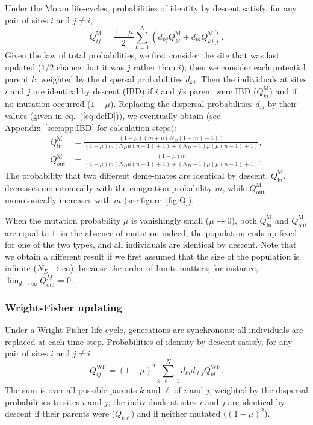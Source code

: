 \documentclass[11pt, letterpaper]{article}
\renewcommand{\eqref}[1]{\textup{{\normalfont eq.~(\ref{#1}}\normalfont)}}
\newcommand{\appname}[0]{Appendix}
\newcommand{\Moran}{\textrm{M}}
\newcommand{\WF}{\textrm{WF}}
\newcommand{\inn}{\textrm{in}}
\newcommand{\out}{\textrm{out}}
\newcommand{\Qin}{Q_{\inn}}
\newcommand{\Qout}{Q_{\out}}
\newcommand{\ndemes}{N_D}
\begin{document}
Under the Moran life-cycles, probabilities of identity by descent satisfy, for any pair of sites $i$ and $j\neq i$,
\begin{equation}
Q_{ij}^{\Moran} = \frac{1-\mu}{2} \sum_{k=1}^N \left(d_{kj} Q_{ki}^{\Moran} + d_{ki} Q_{kj}^{\Moran}\right).
\end{equation}
%
Given the law of total probabilities, we first consider the site that was last updated ($1/2$ chance that it was $j$ rather than $i$); then we consider each potential parent $k$, weighted by the dispersal probabilities $d_{kj}$. Then the individuals at sites $i$ and $j$ are identical by descent (IBD) if $i$ and $j$'s parent were IBD ($Q_{ki}^{\Moran}$) and if no mutation occurred ($1-\mu$).  Replacing the dispersal probabilities $d_{ij}$ by their values (given in \eqref{eq:defD}), we eventually obtain (see \appname~\ref{sec:app:IBD} for calculation steps):
\begin{subequations}\label{eq:QM}
\begin{align}
\Qin^{\Moran} &= \frac{(1-\mu ) \left(m + \mu  (\ndemes (1-m)-1)\right)}{(1-\mu ) m (\ndemes \mu  (n-1)+1)+(\ndemes-1) \mu  (\mu  (n-1)+1)},\\
%
%
\Qout^{\Moran} & = \frac{(1-\mu ) m}{(1-\mu ) m (\ndemes \mu  (n-1)+1)+(\ndemes-1) \mu  (\mu  (n-1)+1)}.
\end{align}
\end{subequations}
%
The probability that two different deme-mates are identical by descent, $\Qin^{\Moran}$, decreases monotonically with the emigration probability $m$, while  $\Qout^{\Moran}$ monotonically increases with $m$ (see figure~\ref{fig:Q}). 

When the mutation probability $\mu$ is vanishingly small ($\mu \to 0$), both $\Qin^{\Moran}$ and $\Qout^{\Moran}$ are equal to $1$: in the absence of mutation indeed, the population ends up fixed for one of the two types, and all individuals are identical by descent. Note that we obtain a different result if we first assumed that the size of the population is infinite ($\ndemes \to \infty$), because the order of limits matters; %
for instance, $\lim_{d\to \infty} \Qout^{M}=0$. 


\subsubsection{Wright-Fisher updating}

Under a Wright-Fisher life-cycle, generations are synchronous: all individuals are replaced at each time step. Probabilities of identity by descent satisfy, for any pair of sites $i$ and $j \neq i$
\begin{equation}
Q_{ij}^{\WF} = (1-\mu)^2 \sum_{k,\ell = 1}^N d_{ki} d_{\ell j} Q_{kl}^{\WF}.
\end{equation}
The sum is over all possible parents $k$ and $\ell$ of $i$ and $j$, weighted by the dispersal probabilities to sites $i$ and $j$; the individuals at sites $i$ and $j$ are identical by descent if their parents were ($Q_{k\ell}$) and if neither mutated ($(1-\mu)^2$). 
\end{document}
